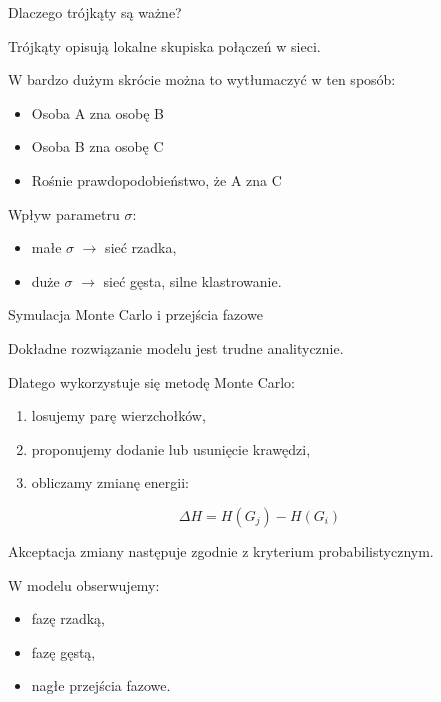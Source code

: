 \documentclass{beamer}
\begin{document}

\begin{frame}{Dlaczego trójkąty są ważne?}

Trójkąty opisują lokalne skupiska połączeń w sieci.

\vspace{0.5cm}

W bardzo dużym skrócie można to wytłumaczyć w ten sposób:
\begin{itemize}
    \item Osoba A zna osobę B
    \item Osoba B zna osobę C
    \item Rośnie prawdopodobieństwo, że A zna C
\end{itemize}

\vspace{0.5cm}

Wpływ parametru $\sigma$:

\begin{itemize}
    \item małe $\sigma$ $\rightarrow$ sieć rzadka,
    \item duże $\sigma$ $\rightarrow$ sieć gęsta, silne klastrowanie.
\end{itemize}

\end{frame}


\begin{frame}{Symulacja Monte Carlo i przejścia fazowe}

Dokładne rozwiązanie modelu jest trudne analitycznie.

\vspace{0.4cm}

Dlatego wykorzystuje się metodę Monte Carlo:

\begin{enumerate}
    \item losujemy parę wierzchołków,
    \item proponujemy dodanie lub usunięcie krawędzi,
    \item obliczamy zmianę energii:
\end{enumerate}

\[
\Delta H = H(G_j)-H(G_i)
\]

Akceptacja zmiany następuje zgodnie z kryterium probabilistycznym.

\vspace{0.4cm}

W modelu obserwujemy:

\begin{itemize}
    \item fazę rzadką,
    \item fazę gęstą,
    \item nagłe przejścia fazowe.
\end{itemize}

\end{frame}
\end{document}
